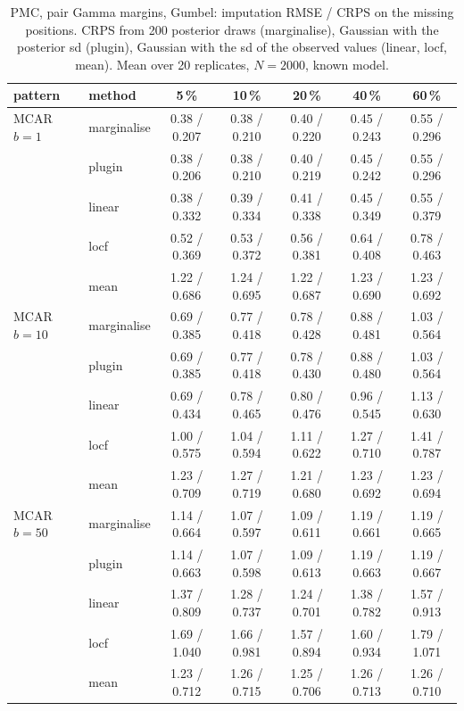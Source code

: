 \begin{table}[htbp]
  \centering
  \small
  \setlength{\tabcolsep}{4pt}
  \caption{PMC, pair Gamma margins, Gumbel: imputation RMSE / CRPS on the missing positions. CRPS from 200 posterior draws (marginalise), Gaussian with the posterior sd (plugin), Gaussian with the sd of the observed values (linear, locf, mean). Mean over 20 replicates, $N = 2000$, known model.}
  \label{tab:missing-imp-pmc_pair_gamma_gumbel_k2}
  \begin{tabular}{llccccc}
    \toprule
    pattern & method & 5\,\% & 10\,\% & 20\,\% & 40\,\% & 60\,\% \\
    \midrule
    MCAR $b{=}1$ & marginalise & 0.38 / 0.207 & 0.38 / 0.210 & 0.40 / 0.220 & 0.45 / 0.243 & 0.55 / 0.296 \\
     & plugin & 0.38 / 0.206 & 0.38 / 0.210 & 0.40 / 0.219 & 0.45 / 0.242 & 0.55 / 0.296 \\
     & linear & 0.38 / 0.332 & 0.39 / 0.334 & 0.41 / 0.338 & 0.45 / 0.349 & 0.55 / 0.379 \\
     & locf & 0.52 / 0.369 & 0.53 / 0.372 & 0.56 / 0.381 & 0.64 / 0.408 & 0.78 / 0.463 \\
     & mean & 1.22 / 0.686 & 1.24 / 0.695 & 1.22 / 0.687 & 1.23 / 0.690 & 1.23 / 0.692 \\
    \addlinespace
    MCAR $b{=}10$ & marginalise & 0.69 / 0.385 & 0.77 / 0.418 & 0.78 / 0.428 & 0.88 / 0.481 & 1.03 / 0.564 \\
     & plugin & 0.69 / 0.385 & 0.77 / 0.418 & 0.78 / 0.430 & 0.88 / 0.480 & 1.03 / 0.564 \\
     & linear & 0.69 / 0.434 & 0.78 / 0.465 & 0.80 / 0.476 & 0.96 / 0.545 & 1.13 / 0.630 \\
     & locf & 1.00 / 0.575 & 1.04 / 0.594 & 1.11 / 0.622 & 1.27 / 0.710 & 1.41 / 0.787 \\
     & mean & 1.23 / 0.709 & 1.27 / 0.719 & 1.21 / 0.680 & 1.23 / 0.692 & 1.23 / 0.694 \\
    \addlinespace
    MCAR $b{=}50$ & marginalise & 1.14 / 0.664 & 1.07 / 0.597 & 1.09 / 0.611 & 1.19 / 0.661 & 1.19 / 0.665 \\
     & plugin & 1.14 / 0.663 & 1.07 / 0.598 & 1.09 / 0.613 & 1.19 / 0.663 & 1.19 / 0.667 \\
     & linear & 1.37 / 0.809 & 1.28 / 0.737 & 1.24 / 0.701 & 1.38 / 0.782 & 1.57 / 0.913 \\
     & locf & 1.69 / 1.040 & 1.66 / 0.981 & 1.57 / 0.894 & 1.60 / 0.934 & 1.79 / 1.071 \\
     & mean & 1.23 / 0.712 & 1.26 / 0.715 & 1.25 / 0.706 & 1.26 / 0.713 & 1.26 / 0.710 \\

\end{tabular}
\end{table}
